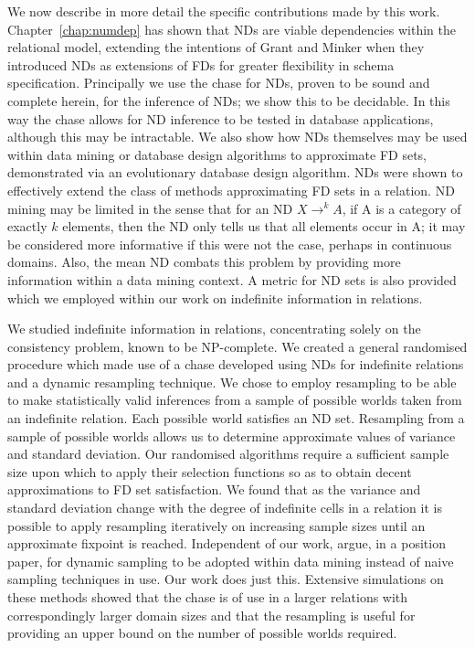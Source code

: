 We now describe in more detail the specific contributions made by this work.
Chapter~\ref{chap:numdep} has shown that NDs are viable dependencies
within the relational model, extending the intentions of Grant and Minker
\cite{gm85b,gm85a} when they introduced NDs as extensions of FDs for
greater flexibility in schema specification. Principally we use the
chase for NDs, proven to be sound and complete herein, for the
inference of NDs; we show this to be decidable. In this way the chase allows for ND inference
to be tested in database applications, although this may be
intractable. We also show how NDs themselves 
may be used within data mining or database design algorithms to
approximate FD sets, demonstrated via an evolutionary database design
algorithm. NDs were shown to effectively extend the class of methods
approximating FD sets in a relation.  
ND mining may be limited in the sense that for an ND $X \to^k A$, if A
is a category of exactly $k$ elements, then the ND only
tells us that all elements occur in A; it may be considered more
informative if this were not the case, perhaps in continuous
domains. Also, the mean ND combats 
this problem by providing more information within a data mining context.
A metric for ND sets is
also provided which we employed within our work on indefinite
information in relations.

\medskip

We studied indefinite information in relations, concentrating solely
on the consistency problem, known to be NP-complete. We created a
general randomised procedure which made use of a chase developed using
NDs for indefinite relations and a dynamic resampling technique. We
chose to employ resampling to be able to make statistically valid
inferences from a sample of possible worlds taken from an indefinite
relation. Each possible world satisfies an ND set. Resampling from a
sample of possible worlds allows us to determine approximate values of
variance and standard deviation. Our randomised algorithms require a
sufficient sample size upon which to apply their selection functions
so as to obtain decent approximations to FD set satisfaction. We found
that as the variance and standard deviation change with the degree of
indefinite cells in a relation it is possible to apply resampling
iteratively on increasing sample sizes until an approximate fixpoint
is reached. Independent of our work, \cite{jl96} argue, in a position
paper, for dynamic sampling to be adopted within data mining instead of
naive sampling techniques in use. Our work does just this. Extensive
simulations on these methods showed that the chase is of use in
a larger relations with correspondingly larger domain sizes and that
the resampling is useful for providing an 
upper bound on the number of possible worlds required.

